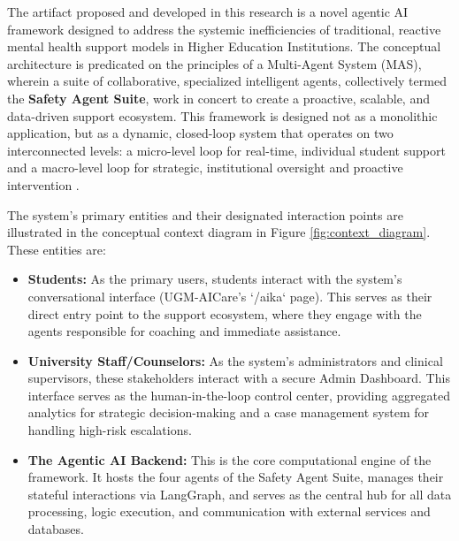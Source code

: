 The artifact proposed and developed in this research is a novel agentic AI framework designed to address the systemic inefficiencies of traditional, reactive mental health support models in Higher Education Institutions. The conceptual architecture is predicated on the principles of a Multi-Agent System (MAS), wherein a suite of collaborative, specialized intelligent agents, collectively termed the \textbf{Safety Agent Suite}, work in concert to create a proactive, scalable, and data-driven support ecosystem. This framework is designed not as a monolithic application, but as a dynamic, closed-loop system that operates on two interconnected levels: a micro-level loop for real-time, individual student support and a macro-level loop for strategic, institutional oversight and proactive intervention \cite{kashiv2025aidrivennetworks, nwoke2025insightautomation}.

The system's primary entities and their designated interaction points are illustrated in the conceptual context diagram in Figure \ref{fig:context_diagram}. These entities are:
\begin{itemize}
    \item \textbf{Students:} As the primary users, students interact with the system's conversational interface (UGM-AICare's `/aika` page). This serves as their direct entry point to the support ecosystem, where they engage with the agents responsible for coaching and immediate assistance.
    \item \textbf{University Staff/Counselors:} As the system's administrators and clinical supervisors, these stakeholders interact with a secure Admin Dashboard. This interface serves as the human-in-the-loop control center, providing aggregated analytics for strategic decision-making and a case management system for handling high-risk escalations.
    \item \textbf{The Agentic AI Backend:} This is the core computational engine of the framework. It hosts the four agents of the Safety Agent Suite, manages their stateful interactions via LangGraph, and serves as the central hub for all data processing, logic execution, and communication with external services and databases.
\end{itemize}

